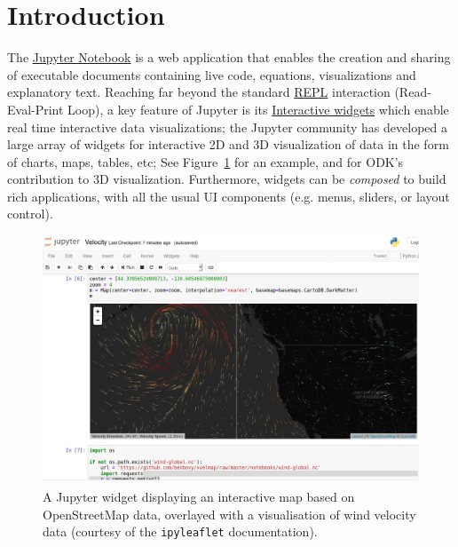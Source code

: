 \documentclass{deliverablereport}
\author{Odile Bénassy and Nicolas M. Thiéry}
\begin{document}
\maketitle
\githubissuedescription

\section{Introduction}


The \href{https://jupyter.org}{Jupyter Notebook} is a web application
that enables the creation and sharing of executable documents
containing live code, equations, visualizations and explanatory text.
Reaching far beyond the standard
\href{https://en.wikipedia.org/wiki/Read-eval-print_loop}{REPL}
interaction (Read-Eval-Print Loop), a key feature of Jupyter is its
\href{http://jupyter.org/widgets}{Interactive widgets} which enable
real time interactive data visualizations; the Jupyter community has
developed a large array of widgets for interactive 2D and 3D
visualization of data in the form of charts, maps, tables, etc;
See Figure~\ref{fig:ipyleaflet} for an example, and
 for ODK's contribution to 3D visualization.
Furthermore, widgets can be \emph{composed} to build rich
applications, with all the usual UI components (e.g. menus, sliders,
or layout control).

\begin{figure}[h]
  \begin{center}
    \includegraphics[width=\textwidth]{images/Velocity}
  \end{center}
  \caption{A Jupyter widget displaying an interactive map based on
    OpenStreetMap data, overlayed with a visualisation of wind velocity
    data (courtesy of the \lstinline{ipyleaflet} documentation).}
  \label{fig:ipyleaflet}
\end{figure}
\end{document}
